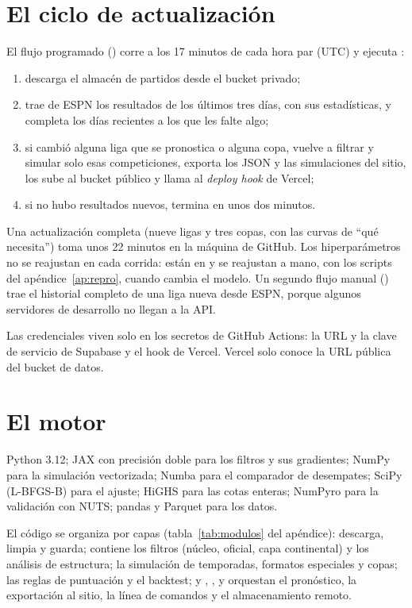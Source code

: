\section{El ciclo de actualización}

El flujo programado () corre a los 17 minutos de cada hora par (UTC) y ejecuta :

\begin{enumerate}
\item descarga el almacén de partidos desde el bucket privado;
\item trae de ESPN los resultados de los últimos tres días, con sus estadísticas, y completa los días recientes a los que les falte algo;
\item si cambió alguna liga que se pronostica o alguna copa, vuelve a filtrar y simular solo esas competiciones, exporta los JSON y las simulaciones del sitio, los sube al bucket público y llama al \emph{deploy hook} de Vercel;
\item si no hubo resultados nuevos, termina en unos dos minutos.
\end{enumerate}

Una actualización completa (nueve ligas y tres copas, con las curvas de ``qué necesita'') toma unos 22 minutos en la máquina de GitHub. Los hiperparámetros no se reajustan en cada corrida: están en  y se reajustan a mano, con los scripts del apéndice~\ref{ap:repro}, cuando cambia el modelo. Un segundo flujo manual () trae el historial completo de una liga nueva desde ESPN, porque algunos servidores de desarrollo no llegan a la API.

Las credenciales viven solo en los secretos de GitHub Actions: la URL y la clave de servicio de Supabase y el hook de Vercel. Vercel solo conoce la URL pública del bucket de datos.

\section{El motor}

 Python 3.12; JAX con precisión doble para los filtros y sus gradientes; NumPy para la simulación vectorizada; Numba para el comparador de desempates; SciPy (L-BFGS-B) para el ajuste; HiGHS para las cotas enteras; NumPyro para la validación con NUTS; pandas y Parquet para los datos.

 El código se organiza por capas (tabla~\ref{tab:modulos} del apéndice):  descarga, limpia y guarda;  contiene los filtros (núcleo, oficial, capa continental) y los análisis de estructura;  la simulación de temporadas, formatos especiales y copas;  las reglas de puntuación y el backtest; y , ,  y  orquestan el pronóstico, la exportación al sitio, la línea de comandos y el almacenamiento remoto.

